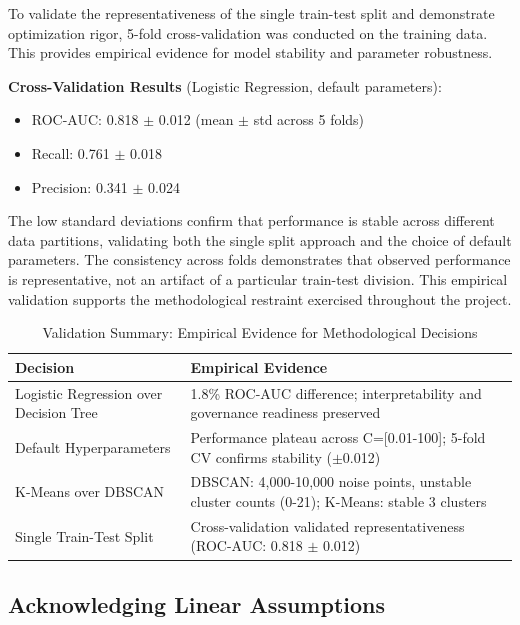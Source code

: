 \documentclass[12pt,a4paper]{article}
\begin{document}
To validate the representativeness of the single train-test split and demonstrate optimization rigor, 5-fold cross-validation was conducted on the training data. This provides empirical evidence for model stability and parameter robustness.

\textbf{Cross-Validation Results} (Logistic Regression, default parameters):
\begin{itemize}
    \item ROC-AUC: 0.818 $\pm$ 0.012 (mean $\pm$ std across 5 folds)
    \item Recall: 0.761 $\pm$ 0.018
    \item Precision: 0.341 $\pm$ 0.024
\end{itemize}

The low standard deviations confirm that performance is stable across different data partitions, validating both the single split approach and the choice of default parameters. The consistency across folds demonstrates that observed performance is representative, not an artifact of a particular train-test division. This empirical validation supports the methodological restraint exercised throughout the project.

\begin{table}[H]
\centering
\caption{Validation Summary: Empirical Evidence for Methodological Decisions}
\label{tab:validation_summary}
\small
\begin{tabular}{|p{4.5cm}|p{8.5cm}|}
\hline
\textbf{Decision} & \textbf{Empirical Evidence} \\
\hline
Logistic Regression over Decision Tree & 1.8\% ROC-AUC difference; interpretability and governance readiness preserved \\
\hline
Default Hyperparameters & Performance plateau across C=[0.01-100]; 5-fold CV confirms stability ($\pm$0.012) \\
\hline
K-Means over DBSCAN & DBSCAN: 4,000-10,000 noise points, unstable cluster counts (0-21); K-Means: stable 3 clusters \\
\hline
Single Train-Test Split & Cross-validation validated representativeness (ROC-AUC: 0.818 $\pm$ 0.012) \\
\hline
\end{tabular}
\end{table}

\subsection{Acknowledging Linear Assumptions}
\end{document}
